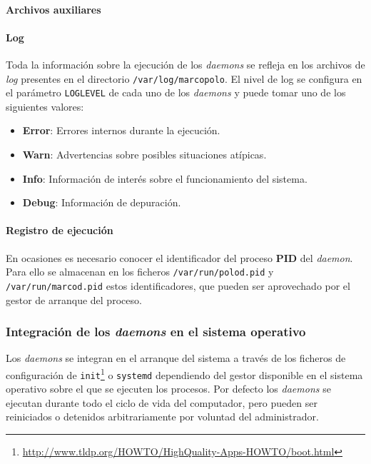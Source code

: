 
\paragraph{Archivos auxiliares}

\paragraph{Log\\}
Toda la información sobre la ejecución de los \textit{daemons} se refleja en los archivos de \textit{log} presentes en el directorio \texttt{/var/log/marcopolo}. El nivel de log se configura en el parámetro \texttt{LOGLEVEL} de cada uno de los \textit{daemons} y puede tomar uno de los siguientes valores:

\begin{itemize}
\item \textbf{Error}: Errores internos durante la ejecución.
\item \textbf{Warn}: Advertencias sobre posibles situaciones atípicas.
\item \textbf{Info}: Información de interés sobre el funcionamiento del sistema.
\item \textbf{Debug}: Información de depuración.
\end{itemize}


\paragraph{Registro de ejecución}

En ocasiones es necesario conocer el identificador del proceso \textbf{PID} del \textit{daemon}. Para ello se almacenan en los ficheros \texttt{/var/run/polod.pid} y \texttt{/var/run/marcod.pid} estos identificadores, que pueden ser aprovechado por el gestor de arranque del proceso.

\subsubsection{Integración de los \textit{daemons} en el sistema operativo}

Los \textit{daemons} se integran en el arranque del sistema a través de los ficheros de configuración de \texttt{init}\footnote{\href{http://www.tldp.org/HOWTO/HighQuality-Apps-HOWTO/boot.html}{http://www.tldp.org/HOWTO/HighQuality-Apps-HOWTO/boot.html}} o \texttt{systemd} dependiendo del gestor disponible en el sistema operativo sobre el que se ejecuten los procesos. Por defecto los \textit{daemons} se ejecutan durante todo el ciclo de vida del computador, pero pueden ser reiniciados o detenidos arbitrariamente por voluntad del administrador.

